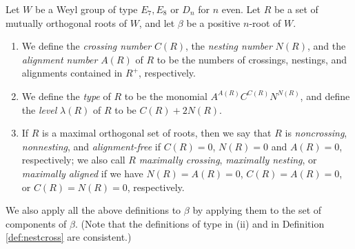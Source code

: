 \documentclass[10pt,a4paper]{amsart}
\begin{document}
\begin{defn}\label{def:stats} Let $W$ be a Weyl group of type $E_7, E_8$ or
      $D_{n}$ for $n$ even.  Let $R$ be a set of mutually orthogonal roots of
      $W$, and let $\beta$ be a positive $n$-root of $W$.
      \begin{enumerate}
          \item[(i)] We define the {\it crossing number} $C(R)$, the
               \emph{nesting number} $N(R)$, and the \emph{alignment number}
               $A(R)$ of $R$ to be the numbers of crossings, nestings, and
               alignments contained in $R^+$, respectively.
           \item[(ii)] We define the \emph{type} of $R$ to be the monomial
      $A^{A(R)}C^{C(R)}N^{N(R)}$, and define the {\it level} $\lambda(R)$ of $R$
      to be $C(R) + 2N(R)$.
  \item[(iii)] If $R$ is a maximal orthogonal set of roots, then we say that $R$
      is \emph{noncrossing}, \emph{nonnesting}, and \emph{alignment-free} if
      $C(R)=0$, $N(R)=0$ and $A(R)=0$, respectively; we also call $R$ {\it
      maximally crossing}, {\it maximally nesting}, or {\it maximally aligned}
      if we have $N(R)=A(R)=0$, $C(R)=A(R)=0$, or $C(R)=N(R)=0$, respectively.
\end{enumerate} We also apply all the above definitions to $\beta$ by applying them to
    the set of components of $\beta$. (Note that the
    definitions of type in (ii) and in Definition \ref{def:nestcross} are
consistent.)
\end{defn}
\end{document}
